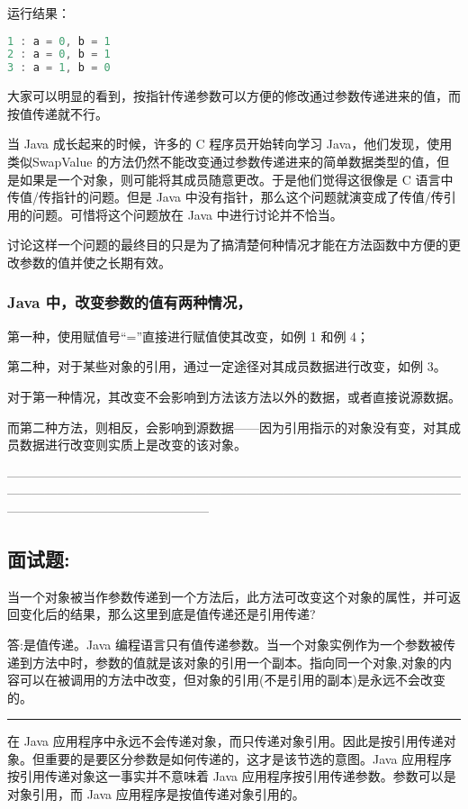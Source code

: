 \documentclass[10pt,b5paper]{article}
\begin{document}
运行结果：
\begin{lstlisting}[language=java]
1 : a = 0, b = 1 
2 : a = 0, b = 1 
3 : a = 1, b = 0
\end{lstlisting} 

大家可以明显的看到，按指针传递参数可以方便的修改通过参数传递进来的值，而按值传递就不行。

当 Java 成长起来的时候，许多的 C 程序员开始转向学习 Java，他们发现，使用类似SwapValue 的方法仍然不能改变通过参数传递进来的简单数据类型的值，但是如果是一个对象，则可能将其成员随意更改。于是他们觉得这很像是 C 语言中传值/传指针的问题。但是 Java 中没有指针，那么这个问题就演变成了传值/传引用的问题。可惜将这个问题放在 Java 中进行讨论并不恰当。

讨论这样一个问题的最终目的只是为了搞清楚何种情况才能在方法函数中方便的更改参数的值并使之长期有效。

\subsubsection{Java 中，改变参数的值有两种情况，}
\label{sec-1-4-1}

第一种，使用赋值号“=”直接进行赋值使其改变，如例 1 和例 4；

第二种，对于某些对象的引用，通过一定途径对其成员数据进行改变，如例 3。

对于第一种情况，其改变不会影响到方法该方法以外的数据，或者直接说源数据。

而第二种方法，则相反，会影响到源数据——因为引用指示的对象没有变，对其成员数据进行改变则实质上是改变的该对象。

————————————————————————————————————————————————————————————————————————————————————————
\subsection{面试题:}
\label{sec-1-5}
当一个对象被当作参数传递到一个方法后，此方法可改变这个对象的属性，并可返回变化后的结果，那么这里到底是值传递还是引用传递? 

答:是值传递。Java 编程语言只有值传递参数。当一个对象实例作为一个参数被传递到方法中时，参数的值就是该对象的引用一个副本。指向同一个对象,对象的内容可以在被调用的方法中改变，但对象的引用(不是引用的副本)是永远不会改变的。 

\rule{\linewidth}{0.5pt}

在 Java 应用程序中永远不会传递对象，而只传递对象引用。因此是按引用传递对象。但重要的是要区分参数是如何传递的，这才是该节选的意图。Java 应用程序按引用传递对象这一事实并不意味着 Java 应用程序按引用传递参数。参数可以是对象引用，而 Java 应用程序是按值传递对象引用的。 
\end{document}
